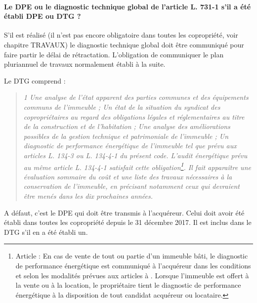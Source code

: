 			\paragraph{Le DPE ou le diagnostic technique global de l'article L. 731-1 s’il a été établi DPE ou DTG ?}
			
			\par S’il est réalisé (il n’est pas encore obligatoire dans toutes les copropriété, voir chapitre TRAVAUX) le
			diagnostic technique global doit être communiqué pour faire partir le délai de rétractation. L’obligation de
			communiquer le plan pluriannuel de travaux normalement établi à la suite.
			
			Le DTG comprend :
			\begin{quote}
				\emph{1\degre{} Une analyse de l'état apparent des parties communes et des équipements communs de l'immeuble ;
				\degre{} Un état de la situation du syndicat des copropriétaires au regard des obligations légales et
				réglementaires au titre de la construction et de l'habitation ;
				\degre{} Une analyse des améliorations possibles de la gestion technique et patrimoniale de l'immeuble ;
				\degre{} Un diagnostic de performance énergétique de l'immeuble tel que prévu aux articles L. 134-3 ou L. 134-4-1 du présent code. L'audit énergétique prévu au même article L. 134-4-1 satisfait cette obligation\footnote{
					Article  : En cas de vente de tout ou partie d'un immeuble bâti, le diagnostic de
					performance énergétique est communiqué à l'acquéreur dans les conditions et selon les modalités
					prévues aux articles  à . Lorsque l'immeuble est offert à la vente ou à la location, le	propriétaire tient le diagnostic de performance énergétique à la disposition de tout candidat acquéreur ou locataire.
				}.
				\newline \medskip
				Il fait apparaître une évaluation sommaire du coût et une liste des travaux nécessaires à la conservation
				de l'immeuble, en précisant notamment ceux qui devraient être menés dans les dix prochaines années.}
			\end{quote}
			
			A défaut, c’est le DPE qui doit être transmis à l’acquéreur. Celui doit avoir été établi dans toutes les
			copropriété depuis le 31 décembre 2017. Il est inclus dans le DTG s’il en a été établi un.
			
